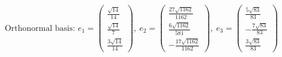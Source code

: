 \[ \text{Orthonormal basis: }e_1=\begin{pmatrix}\frac{\sqrt{14}}{14} \\ \frac{\sqrt{14}}{7} \\ \frac{3 \sqrt{14}}{14}\end{pmatrix},\ e_2=\begin{pmatrix}\frac{27 \sqrt{1162}}{1162} \\ \frac{6 \sqrt{1162}}{581} \\ - \frac{17 \sqrt{1162}}{1162}\end{pmatrix},\ e_3=\begin{pmatrix}\frac{5 \sqrt{83}}{83} \\ - \frac{7 \sqrt{83}}{83} \\ \frac{3 \sqrt{83}}{83}\end{pmatrix} \]

